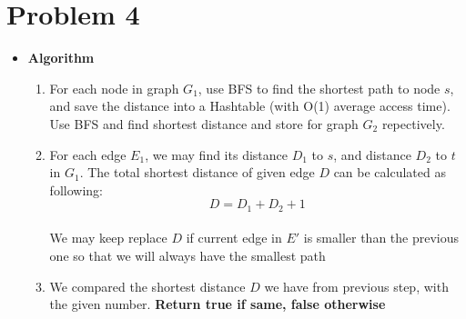 \documentclass{article}
\def\math#1{$#1$}
\begin{document}
\section{Problem 4}
\begin{itemize}
    \item [] \textbf{Algorithm}
        \begin{enumerate}[Step 1]
            \item For each node in graph \math{G_1}, use BFS to find the shortest path to node \math{s}, and save the distance into a Hashtable (with O(1) average access time). Use BFS and find shortest distance and store for graph \math{G_2} repectively.
            \item For each edge \math{E_1}, we may find its distance \math{D_1} to \math{s}, and distance \math{D_2} to \math{t} in \math{G_1}. The total shortest distance of given edge \math{D} can be calculated as following: \\
            \begin{equation}
                D = D_1 + D_2 + 1
            \end{equation} \\ 
            We may keep replace \math{D} if current edge in \math{E'} is smaller than the previous one so that we will always have the smallest path
            \item We compared the shortest distance \math{D} we have from previous step, with the given number.  \textbf{Return true if same, false otherwise}
        \end{enumerate}

\end{itemize}
\end{document}
